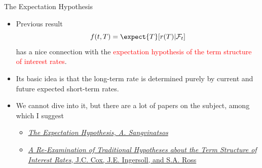\documentclass{beamer}
\begin{document}
\begin{frame}{The Expectation Hypothesis}
	\begin{itemize}
		\item Previous result
		\begin{equation*}
			f(t, T) = \expect{T}[r(T)|\mathcal{F}_t]
		\end{equation*}
		has a nice connection with the \textcolor{red}{expectation hypothesis of the term structure of interest rates}.
		\item Its basic idea is that the long-term rate is determined purely by current and future expected short-term rates.
		\item We cannot dive into it, but there are a lot of papers on the subject, among which I suggest
		\begin{itemize}
			\item \href{https://pages.stern.nyu.edu/~sternfin/asangvin/ExpHyp.pdf}{\emph{The Expectation Hypothesis, A. Sangvinatsos}}
			\item \href{https://www.jstor.org/stable/2327547}{\emph{A Re-Examination of Traditional Hypotheses about the Term Structure of Interest Rates}, J.C. Cox, J.E. Ingersoll, and S.A. Ross}
		\end{itemize}
	\end{itemize}
\end{frame}


\end{document}
